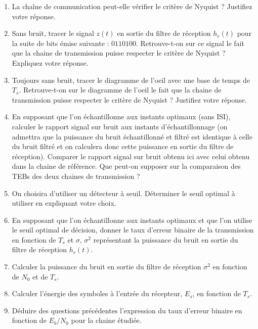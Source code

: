 \documentclass{article}
\begin{document}
    \begin{enumerate}
        \item La chaîne de communication peut-elle vérifier le critère de Nyquist ? Justifiez votre réponse.
        \item Sans bruit, tracer le signal $z(t)$ en sortie du filtre de réception $h_r(t)$ pour la suite de bits émise suivante : $0110100$. Retrouve-t-on sur ce signal le fait que la chaine de transmission puisse respecter le critère de Nyquist ? Expliquez votre réponse.
        \item Toujours sans bruit, tracer le diagramme de l'oeil avec une base de temps de $T_s$. Retrouve-t-on sur le diagramme de l'oeil le fait que la chaine de transmission puisse respecter le critère de Nyquist ? Justifiez votre réponse.
        \item En supposant que l'on échantillonne aux instants optimaux (sans ISI), calculer le rapport signal sur bruit aux instants d'échantillonnage (on admettra que la puissance du bruit échantillonné et filtré est identique à celle du bruit filtré et on calculera donc cette puissance en sortie du filtre de réception). Comparer le rapport signal sur bruit obtenu ici avec celui obtenu dans la chaine de référence. Que peut-on supposer sur la comparaison des TEBs des deux chaines de transmission ?
        \item On choisira d'utiliser un détecteur à seuil. Déterminer le seuil optimal à utiliser en expliquant votre choix.
        \item En supposant que l'on échantillonne aux instants optimaux et que l'on utilise le seuil optimal de décision, donner le taux d'erreur binaire de la transmission en fonction de $T_s$ et $\sigma$, $\sigma^2$ représentant la puissance du bruit en sortie du filtre de réception $h_r(t)$.
        \item Calculer la puissance du bruit en sortie du filtre de réception $\sigma^2$ en fonction de $N_0$ et de $T_s$.
        \item Calculer l'énergie des symboles à l'entrée du récepteur, $E_s$, en fonction de $T_s$.
        \item Déduire des questions précédentes l'expression du taux d'erreur binaire en fonction de $E_b/N_0$ pour la chaine étudiée.
    \end{enumerate}
\end{document}
